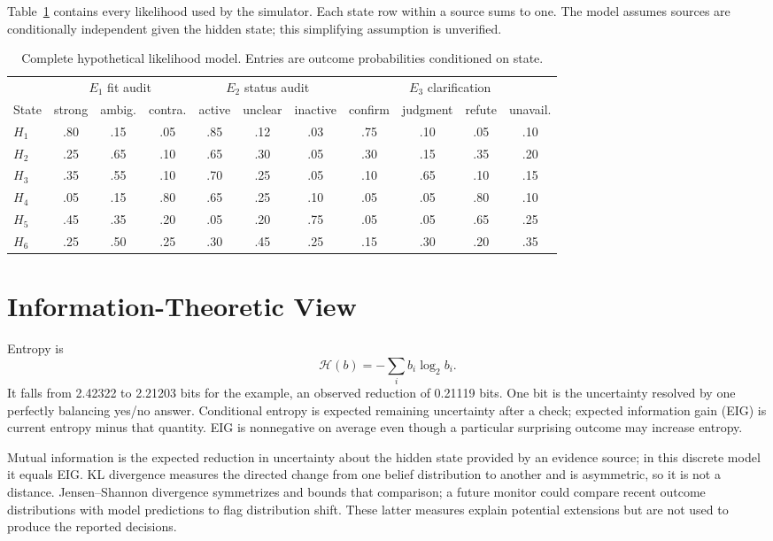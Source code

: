 \documentclass{article}
\begin{document}
Table~\ref{tab:likelihoods} contains every likelihood used by the simulator. Each state row within a source sums to one. The model assumes sources are conditionally independent given the hidden state; this simplifying assumption is unverified.

\begin{table}[t]
\centering\scriptsize
\caption{Complete hypothetical likelihood model. Entries are outcome probabilities conditioned on state.}
\label{tab:likelihoods}
\begin{tabular}{lccc|ccc|cccc}
\toprule
&\multicolumn{3}{c}{$E_1$ fit audit}&\multicolumn{3}{c}{$E_2$ status audit}&\multicolumn{4}{c}{$E_3$ clarification}\\
State&strong&ambig.&contra.&active&unclear&inactive&confirm&judgment&refute&unavail.\\
\midrule
$H_1$&.80&.15&.05&.85&.12&.03&.75&.10&.05&.10\\
$H_2$&.25&.65&.10&.65&.30&.05&.30&.15&.35&.20\\
$H_3$&.35&.55&.10&.70&.25&.05&.10&.65&.10&.15\\
$H_4$&.05&.15&.80&.65&.25&.10&.05&.05&.80&.10\\
$H_5$&.45&.35&.20&.05&.20&.75&.05&.05&.65&.25\\
$H_6$&.25&.50&.25&.30&.45&.25&.15&.30&.20&.35\\
\bottomrule
\end{tabular}
\end{table}

\section{Information-Theoretic View}

Entropy is
\begin{equation}
\mathcal H(b)=-\sum_i b_i\log_2 b_i.
\end{equation}
It falls from 2.42322 to 2.21203 bits for the example, an observed reduction of 0.21119 bits. One bit is the uncertainty resolved by one perfectly balancing yes/no answer. Conditional entropy is expected remaining uncertainty after a check; expected information gain (EIG) is current entropy minus that quantity. EIG is nonnegative on average even though a particular surprising outcome may increase entropy.

Mutual information is the expected reduction in uncertainty about the hidden state provided by an evidence source; in this discrete model it equals EIG. KL divergence measures the directed change from one belief distribution to another and is asymmetric, so it is not a distance. Jensen--Shannon divergence symmetrizes and bounds that comparison; a future monitor could compare recent outcome distributions with model predictions to flag distribution shift. These latter measures explain potential extensions but are not used to produce the reported decisions.
\end{document}
